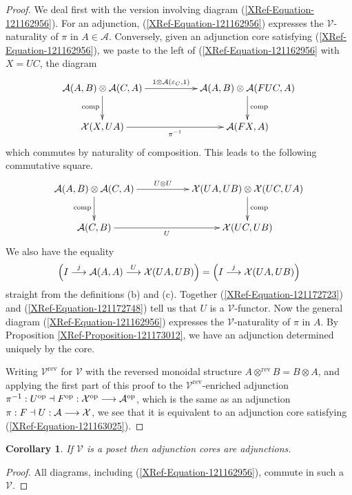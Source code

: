 \documentclass[a4paper,10pt]{article}
\newtheorem{corollary}[theorem]{Corollary}
\newcommand{\ba}{{\cal{A}}}
\newcommand{\bx}{{\cal{X}}}
\newcommand{\ev}{\mathcal{V} }
\numberwithin{equation}{section}
\begin{document}
\begin{proof} 
We deal first with the version involving diagram
(\ref{XRef-Equation-121162956}). For an adjunction, (\ref{XRef-Equation-121162956})
expresses the $\ev$-naturality of $\pi $ in $A\in \mathcal{A}$.
Conversely, given an adjunction core satisfying (\ref{XRef-Equation-121162956}),
we paste to the left of (\ref{XRef-Equation-121162956} with $X =UC$, the diagram 
\begin{equation}
\xymatrix{
\ba (A,B) \otimes \ba (C,A) \ar[rr]^-{1 \otimes \ba (\varepsilon _C ,1) } \ar[d]_-{\mathrm{comp}} && \ba (A,B) \otimes \ba (FUC,A) \ar[d]^-{\mathrm{comp}} \\
\bx (X,UA)  \ar[rr]_-{\pi^{-1} } && \ba (FX,A) }
\end{equation}
which commutes by naturality of composition. This leads to the following commutative square.
\begin{equation}\label{XRef-Equation-121172723}
\xymatrix{
\ba (A,B) \otimes \ba (C,A)  \ar[rr]^-{U \otimes U} \ar[d]_-{\mathrm{comp}} && \bx (UA,UB) \otimes \bx (UC,UA)  \ar[d]^-{\mathrm{comp}} \\
\ba (C,B)  \ar[rr]_-{U} && \bx (UC,UB) }
\end{equation}
We also have the equality
\begin{equation}
\left( I\overset{j}{\longrightarrow }\mathcal{A}( A,A) \overset{U}{\longrightarrow
}\bx( U A,U B) \right) =\left( I\overset{j}{\longrightarrow
}\bx( U A,U B) \right) %
\label{XRef-Equation-121172748}
\end{equation}
straight from the definitions (b) and (c). Together (\ref{XRef-Equation-121172723})
and (\ref{XRef-Equation-121172748}) tell us that $U$ is a $\ev$-functor.
Now the general diagram (\ref{XRef-Equation-121162956}) expresses
the $\ev$-naturality of $\pi $ in $A$. By Proposition \ref{XRef-Proposition-121173012},
we have an adjunction determined uniquely by the core.

Writing $\ev^{\mathrm{rev}}$ for $\ev$ with the
reversed monoidal structure $A\otimes ^{\mathrm{rev}}B=B\otimes
A$, and applying the first part of this proof to the $\ev^{\mathrm{rev}}$-enriched
adjunction $\pi ^{-1}:U^{\mathrm{op}}\dashv F^{\mathrm{op}}:\bx^{\mathrm{op}}\longrightarrow
\mathcal{A}^{\mathrm{op}}$, which is the same as an adjunction $\pi
:F\dashv U:\mathcal{A}\longrightarrow \bx$, we see that
it is equivalent to an adjunction core satisfying (\ref{XRef-Equation-121163025}).
\end{proof}

\begin{corollary}
If $\ev$ is a poset then adjunction cores are adjunctions.
\end{corollary}
\begin{proof}
All diagrams, including (\ref{XRef-Equation-121162956}),
commute in such a $\ev$.
\end{proof}
\end{document}
